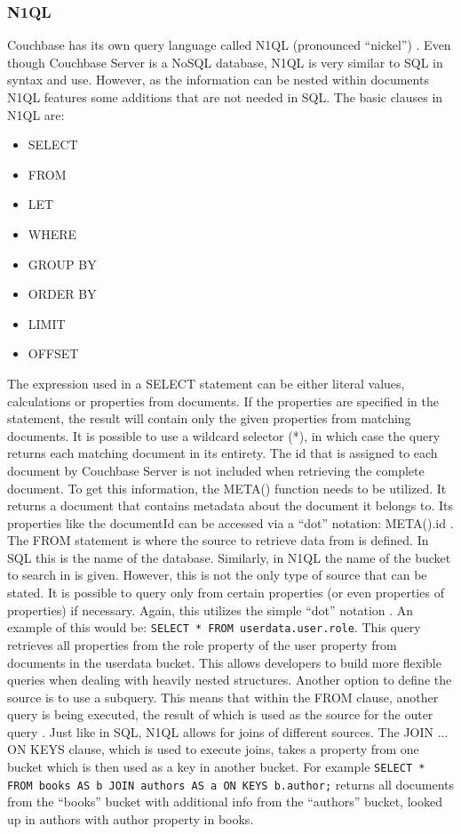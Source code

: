 \subsubsection{N1QL} \label{couchbase:n1ql}
Couchbase has its own query language called N1QL (pronounced \enquote{nickel}) \parencite{couchbaseDocN1Ql}. Even though Couchbase Server is a NoSQL database, N1QL is very similar to SQL in syntax and use. However, as the information can be nested within documents N1QL features some additions that are not needed in SQL. The basic clauses in N1QL are: 
\begin{itemize}
    \item SELECT
    \item FROM
    \item LET
    \item WHERE
    \item GROUP BY
    \item ORDER BY
    \item LIMIT
    \item OFFSET
\end{itemize}
The expression used in a SELECT statement can be either literal values, calculations or properties from documents. If the properties are specified in the statement, the result will contain only the given properties from matching documents. It is possible to use a wildcard selector (*), in which case the query returns each matching document in its entirety. The id that is assigned to each document by Couchbase Server is not included when retrieving the complete document. To get this information, the META() function needs to be utilized. It returns a document that contains metadata about the document it belongs to. Its properties like the documentId can be accessed via a \enquote{dot} notation: META().id \parencite{proCouchbaseServer}.\\
The FROM statement is where the source to retrieve data from is defined. In SQL this is the name of the database. Similarly, in N1QL the name of the bucket to search in is given. However, this is not the only type of source that can be stated. It is possible to query only from certain properties (or even properties of properties) if necessary. Again, this utilizes the simple \enquote{dot} notation  \parencite{proCouchbaseServer}. An example of this would be: \texttt{SELECT * FROM userdata.user.role}. This query retrieves all properties from the role property of the user property from documents in the userdata bucket. This allows developers to build more flexible queries when dealing with heavily nested structures. Another option to define the source is to use a subquery. This means that within the FROM clause, another query is being executed, the result of which is used as the source for the outer query \parencite{couchbaseDocN1Ql}. Just like in SQL, N1QL allows for joins of different sources. The JOIN ... ON KEYS clause, which is used to execute joins, takes a property from one bucket which is then used as a key in another bucket. For example \texttt{SELECT * FROM books AS b JOIN authors AS a ON KEYS b.author;} returns all documents from the \enquote{books} bucket with additional info from the \enquote{authors} bucket, looked up in authors with author property in books. \\
